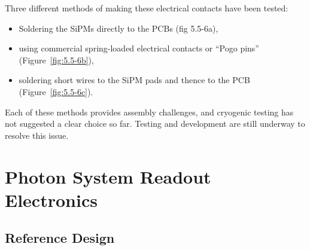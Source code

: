 Three different methods of making these electrical contacts have been tested: 
\begin{itemize}
\item Soldering
the SiPMs directly to the PCBs (fig 5.5-6a), 
\item using commercial
spring-loaded electrical contacts or ``Pogo pins'' (Figure~\ref{fig:5.5-6b}), 
\item soldering short wires to the SiPM pads and thence to the PCB
(Figure~\ref{fig:5.5-6c}).  
\end{itemize}
Each of these methods provides assembly challenges,
and cryogenic testing has not suggested a clear choice so far.
Testing and development are still underway to resolve this issue.

\section{Photon System Readout Electronics}
\label{sec_elec}

\subsection{Reference Design} %

